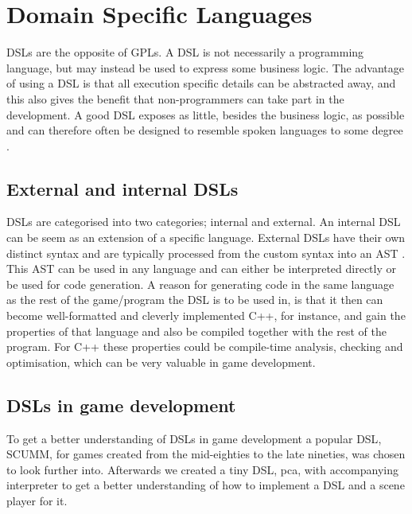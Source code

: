 \section{Domain Specific Languages}
\acp{DSL} are the opposite of \acp{GPL}. A \ac{DSL} is not necessarily a programming language, but may instead be used to express some business logic. The advantage of using a \ac{DSL} is that all execution specific details can be abstracted away, and this also gives the benefit that non-programmers can take part in the development. 
A good \ac{DSL} exposes as little, besides the business logic, as possible and can therefore often be designed to resemble spoken languages to some degree \cite{Walter:2011:IDL:2071423.2071475}.

\subsection{External and internal DSLs}
\acp{DSL} are categorised into two categories; internal and external. An internal \ac{DSL} can be seem as an extension of a specific language. External \acp{DSL} have their own distinct syntax and are typically processed from the custom syntax into an \ac{AST} \cite{beyak2011saga}. This \ac{AST} can be used in any language and can either be interpreted directly or be used for code generation. A reason for generating code in the same language as the rest of the game/program the \ac{DSL} is to be used in, is that it then can become well-formatted and cleverly implemented C++, for instance, and gain the properties of that language and also be compiled together with the rest of the program. For C++ these properties could be compile-time analysis, checking and optimisation, which can be very valuable in game development.

\subsection{DSLs in game development}
To get a better understanding of \acp{DSL} in game development a popular \ac{DSL}, SCUMM\cite{fandon:scumm}, for games created from the mid-eighties to the late nineties, was chosen to look further into. Afterwards we created a tiny \ac{DSL}, pca, with accompanying interpreter to get a better understanding of how to implement a \ac{DSL} and a scene player for it.

